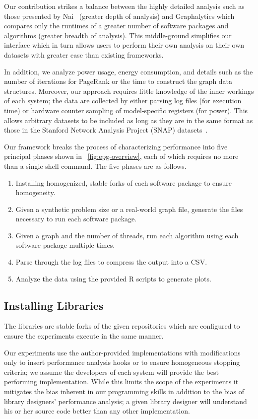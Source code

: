 \documentclass[conference]{IEEEtran}
\begin{document}
Our contribution strikes a balance between the highly detailed analysis such as those presented by Nai~\cite{Nai:2016:architectural} (greater depth of analysis) and Graphalytics which compares only the runtimes of a greater number of software packages and algorithms (greater breadth of analysis). This middle-ground simplifies our interface which in turn allows users to perform their own analysis on their own datasets with greater ease than existing frameworks.

In addition, we analyze  power usage, energy consumption, and details such as the number of iterations for PageRank or the time to construct the graph data structures. Moreover, our approach requires little knowledge of the inner workings of each system; the data are collected by either parsing log files (for execution time) or hardware counter sampling of model-specific registers (for power). This allows arbitrary datasets to be included as long as they are in the same format as those in the Stanford Network Analysis Project (SNAP) datasets~\cite{snapnets}.

Our framework breaks the process of characterizing performance into five principal phases shown in \figurename~\ref{fig:epg-overview}, each of which requires no more than a single shell command. The five phases are as follows.
\begin{enumerate}
	\item Installing homogenized, stable forks of each software package to ensure homogeneity.
	\item Given a synthetic problem size or a real-world graph file, generate the files necessary to run each software package.
	\item Given a graph and the number of threads, run each algorithm using each software package multiple times.
	\item Parse through the log files to compress the output into a CSV.
	\item Analyze the data using the provided R scripts to generate plots.
\end{enumerate}

\subsection{Installing Libraries}
The libraries are stable forks of the given repositories which are configured to ensure the experiments execute in the same manner.

Our experiments use the author-provided implementations with modifications only to insert performance analysis hooks or to ensure homogeneous stopping criteria; we assume the developers of each system will provide the best performing implementation. While this limits the scope of the experiments it mitigates the bias inherent in our programming skills in addition to the bias of library designers' performance analysis; a given library designer will understand his or her source code better than any other implementation.
\end{document}
